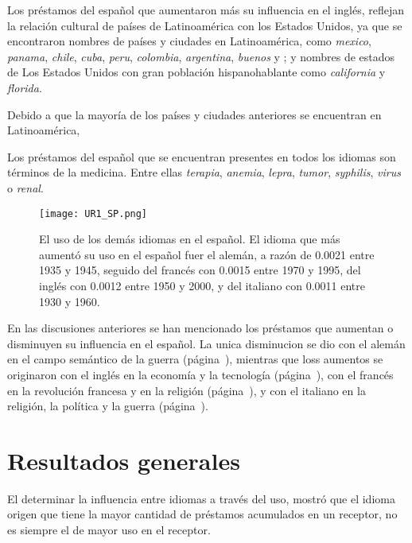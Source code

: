 Los préstamos del español que aumentaron más su influencia en el inglés,
reflejan la relación cultural de países de Latinoamérica con los Estados Unidos, ya que se encontraron nombres de países y ciudades en Latinoamérica, como \textit{mexico}, \textit{panama}, \textit{chile}, \textit{cuba}, \textit{peru}, \textit{colombia}, \textit{argentina},  \textit{buenos} y ; y nombres de estados de Los Estados Unidos con gran población hispanohablante como \textit{california} y \textit{florida}. 

Debido a que la mayoría de los países y ciudades anteriores se encuentran en Latinoamérica, 

Los préstamos del español que se encuentran presentes en todos los idiomas son términos de la medicina. Entre ellas \textit{terapia}, \textit{anemia}, \textit{lepra}, \textit{tumor}, \textit{syphilis}, \textit{virus} o \textit{renal}. 
\label{SP-D}

		
\begin{figure}[h!] %
	\centering
	\texttt{[image: UR1\_SP.png]}
	\caption{El uso de los demás idiomas en el español. El idioma que más aumentó su uso en el español fuer el alemán, a razón de 0.0021 entre 1935 y 1945, seguido del francés con 0.0015 entre 1970 y 1995,  del inglés con 0.0012 entre 1950 y 2000, y del italiano con 0.0011 entre 1930 y 1960.}
	\label{fig.UR_SP}
\end{figure}


En las discusiones anteriores se han mencionado los préstamos que aumentan o disminuyen su influencia en el español. La unica disminucion se dio con el alemán en el campo semántico de la guerra (página~\pageref{GE-D}), mientras que loss aumentos se originaron con el inglés en la economía y la tecnología (página~\pageref{EN-D}),  con el francés en la revolución francesa y en la religión (página~\pageref{FR-D}),  y con el italiano en la religión, la política y la guerra (página~\pageref{IT-D}).





\section{Resultados generales} %


El determinar la influencia entre idiomas a través del uso, mostró que el idioma origen que tiene la mayor cantidad de préstamos acumulados en un receptor, no es siempre el de mayor uso en el receptor.  

